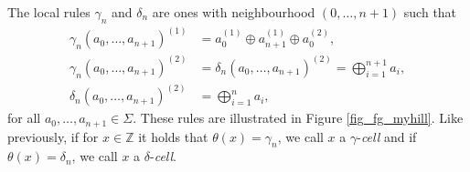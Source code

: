 \documentclass[runningheads]{llncs}
\newcommand{\Z}{\mathbb{Z}}
\begin{document}
\begin{definition}
The local rules $\gamma_n$ and $\delta_n$ are ones with neighbourhood $(0,\ldots,n+1)$ such that
\begin{align*}
\gamma_n (a_0, \ldots, a_{n+1})^{(1)} &= a_0^{(1)} \oplus a_{n+1}^{(1)} \oplus a_0^{(2)}, \\
\gamma_n (a_0, \ldots, a_{n+1})^{(2)} &= \delta_n (a_0, \ldots, a_{n+1})^{(2)} = \bigoplus_{i=1}^{n+1} a_i, \\
\delta_n (a_0, \ldots, a_{n+1})^{(2)} &= \bigoplus_{i=1}^{n} a_i,
\end{align*}
for all $a_0,\ldots,a_{n+1} \in \Sigma$. These rules are illustrated in Figure \ref{fig_fg_myhill}. Like previously, if for $x\in \Z$ it holds that $\theta (x) = \gamma_n$, we call $x$ a $\gamma$-\emph{cell} and if $ \theta (x) = \delta_n$, we call $x$ a $\delta$-\emph{cell}. 
\end{definition}
\end{document}
